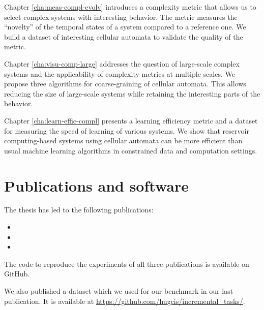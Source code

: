 Chapter \ref{cha:meas-compl-evolv} introduces a complexity metric that allows us 
to select complex systems with interesting behavior. The metric measures the
``novelty'' of the temporal states of a system compared to a reference one. We
build a dataset of interesting cellular automata to validate the quality of the
metric.

Chapter \ref{cha:visu-comp-large} addresses the question of large-scale complex
systems and the applicability of complexity metrics at multiple scales. We
propose three algorithms for coarse-graining of cellular automata. This allows
reducing the size of large-scale systems while retaining the interesting parts
of the behavior.

Chapter \ref{cha:learn-effic-compl} presents a learning efficiency metric and a
dataset for measuring the speed of learning of various systems. We show that
reservoir computing-based systems using cellular automata can be more efficient
than usual machine learning algorithms in constrained data and computation
settings.


\section{Publications and software}

The thesis has led to the following publications:

\begin{itemize}
  \item {}
  \item {}
  \item {}
\end{itemize}

The code to reproduce the experiments of all three publications is available on
GitHub.

We also published a dataset which we used for our benchmark in our last
publication. It is available at
\url{https://github.com/hugcis/incremental_tasks/}.
